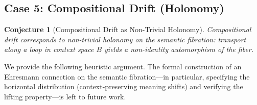 \documentclass[11pt,a4paper]{article}
\theoremstyle{plain}
\newtheorem{conjecture}[theorem]{Conjecture}
\theoremstyle{definition}
\theoremstyle{remark}
\begin{document}
\subsection{Case 5: Compositional Drift (Holonomy)}
\label{sec:case5}

\begin{conjecture}[Compositional Drift as Non-Trivial Holonomy]
\label{conj:case5}
Compositional drift corresponds to non-trivial holonomy on the semantic fibration: transport along a loop in context space $B$ yields a non-identity automorphism of the fiber.
\end{conjecture}

We provide the following heuristic argument. The formal construction of an Ehresmann connection on the semantic fibration---in particular, specifying the horizontal distribution (context-preserving meaning shifts) and verifying the lifting property---is left to future work.
\end{document}
